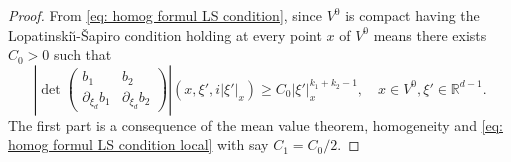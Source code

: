 \documentclass[10pt]{amsart}
\theoremstyle{plain}
\theoremstyle{definition}
\def\R{\mathbb{R}}
\newcommand{\LS}{Lopatinski\u{\i}-\v{S}apiro\xspace}
\begin{document}
\begin{proof}

From \eqref{eq: homog formul LS condition}, since $V^0$ is compact
having the \LS condition holding at every point $x$ of $V^0$ means
there exists $C_0>0$ such that
\begin{equation}
\label{eq: homog formul LS condition local}
\left|\det
\begin{pmatrix}
b_1 &b_2\\[
2pt]
\partial_{\xi_d}b_1& \partial_{\xi_d}b_2
\end{pmatrix}\right|(x,\xi',i |\xi'|_x)
\geq C_0 |\xi'|_x^{k_1+k_2 -1},
\quad x \in V^0, \xi' \in \R^{d-1}.
\end{equation}
The first part is a consequence of the mean value theorem,
homogeneity and \eqref{eq: homog formul LS
condition local} with say $C_1 = C_0 /2$.


\end{proof}
\end{document}
